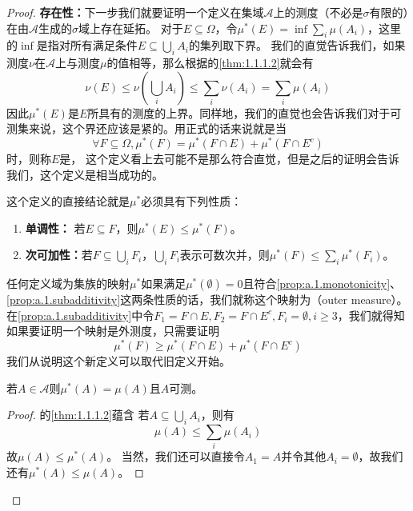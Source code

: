 \documentclass[main.tex]{subfiles}
\begin{document}
\begin{proof}
	\textbf{存在性：}下一步我们就要证明一个定义在集域\(\mathcal{A}\)上的测度（不必是\(\sigma\)有限的）在由\(\mathcal{A}\)生成的\(\sigma\)域上存在延拓。
	对于\(E\subseteq \Omega\)，令\(\mu^*(E)=\inf\sum_i\mu(A_i)\)，这里的\(\inf\)是指对所有满足条件\(E\subseteq \bigcup_i A_i\)的集列取下界。
	我们的直觉告诉我们，如果测度\(\nu\)在\(\mathcal{A}\)上与测度\(\mu\)的值相等，那么根据的\ref{thm:1.1.1.2}就会有
	\[\nu(E) \leq \nu(\bigcup_{i} A_i) \leq \sum_i \nu(A_i) = \sum_i \mu(A_i)\]
	因此\(\mu^*(E)\)是\(E\)所具有的测度的上界。同样地，我们的直觉也会告诉我们对于可测集来说，这个界还应该是紧的。用正式的话来说就是当
	\begin{equation}
		\label{eq:a.1.1}
		\forall F \subseteq \Omega, \mu^*(F) = \mu^*(F\cap E) + \mu^*(F\cap E^c)
	\end{equation}
	时，则称\(E\)是，
	这个定义看上去可能不是那么符合直觉，但是之后的证明会告诉我们，这个定义是相当成功的。

	这个定义的直接结论就是\(\mu^*\)必须具有下列性质：
	\begin{enumerate}
		\item\label{prop:a.1.monotonicity} \textbf{单调性：} 若\(E\subseteq F\)，则\(\mu^*(E) \leq \mu^*(F)\)。
		\item\label{prop:a.1.subadditivity} \textbf{次可加性：}若\(F \subseteq \bigcup_{i}F_i\)，\(\bigcup_{i}F_i\)表示可数次并，则\(\mu^*(F)\leq \sum_i\mu^*(F_i)\)。
	\end{enumerate}
	任何定义域为集族的映射\(\mu^*\)如果满足\(\mu^*(\emptyset) = 0\)且符合\ref{prop:a.1.monotonicity}、\ref{prop:a.1.subadditivity}这两条性质的话，我们就称这个映射为（outer measure）。
	在\ref{prop:a.1.subadditivity}中令\(F_1 = F\cap E, F_2=F\cap E^c, F_i = \emptyset, i\geq 3\)，我们就得知如果要证明一个映射是外测度，只需要证明
	\begin{equation}
		\label{eq:a.1.2}
		\mu^*(F) \geq \mu^*(F\cap E) + \mu^*(F\cap E^c)
	\end{equation}
	我们从说明这个新定义可以取代旧定义开始。
	\begin{lemma} \label{lem:a.1.6}
		若\(A \in \mathcal{A}\)则\(\mu^*(A) = \mu(A)\)且\(A\)可测。
	\end{lemma}
	\begin{proof}
		的\ref{thm:1.1.1.2}蕴含 若\(A \subseteq \bigcup_i A_i\)，则有
		\[\mu(A) \leq \sum_i \mu(A_i)\]
		故\(\mu(A) \leq \mu^*(A)\)。
		当然，我们还可以直接令\(A_1 = A\)并令其他\(A_i = \emptyset\)，故我们还有\(\mu^*(A)\leq \mu(A)\)。


\end{proof}
\end{proof}
\end{document}
